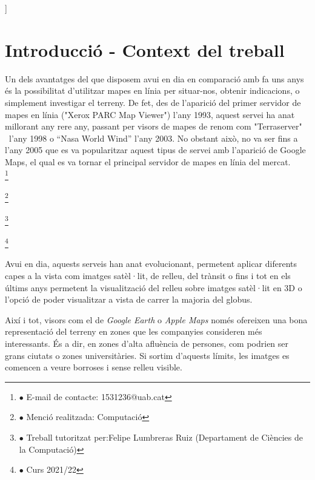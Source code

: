 ﻿\documentclass[10pt,a4paper,twocolumn,twoside]{article}
\newcommand\blfootnote[1]{%
  \begingroup
  \renewcommand\thefootnote{}\footnote{#1}%
  \addtocounter{footnote}{-1}%
  \endgroup
}
\begin{document}
\begin{@twocolumnfalse}
\begin{center}
\bigskip

{\vrule depth 0pt height 0.5pt width 4cm\hspace{7.5pt}%
%
\hspace{7.5pt}\vrule depth 0pt height 0.5pt width 4cm\relax}

\end{center}

\bigskip
\end{@twocolumnfalse}]

\section{Introducció - Context del treball}

Un dels avantatges del que disposem avui en dia en comparació amb fa uns anys és la possibilitat d'utilitzar mapes en línia per situar-nos, obtenir indicacions, o simplement investigar el terreny. De fet, des de l'aparició del primer servidor de mapes en línia ("Xerox PARC Map Viewer") l'any 1993, aquest servei ha anat millorant any rere any, passant per visors de mapes de renom com "Terraserver" \ l'any 1998 o ``Nasa World Wind'' l'any 2003. No obstant això, no va ser fins a l'any 2005 que es va popularitzar aquest tipus de servei amb l'aparició de Google Maps, el qual es va tornar el principal servidor de mapes en línia del mercat.\\
\blfootnote{$\bullet$ E-mail de contacte: 1531236@uab.cat}
\blfootnote{$\bullet$ Menció realitzada: Computació}
\blfootnote{$\bullet$ Treball tutoritzat per:Felipe Lumbreras Ruiz (Departament de Ciències de la Computació)}
\blfootnote{$\bullet$ Curs 2021/22}
\hfill \break

Avui en dia, aquests serveis han anat evolucionant, permetent aplicar diferents capes a la vista com imatges satèl·lit, de relleu, del trànsit o fins i tot en els últims anys permetent la visualització del relleu sobre imatges satèl·lit en 3D o l'opció de poder visualitzar a vista de carrer la majoria del globus.

Així i tot, visors com el de \textit{Google Earth} o \textit{Apple Maps} només ofereixen una bona representació del terreny en zones que les companyies consideren més interessants. És a dir, en zones d'alta afluència de persones, com podrien ser grans ciutats o zones universitàries. Si sortim d'aquests límits, les imatges es comencen a veure borroses i sense relleu visible.
\end{document}
